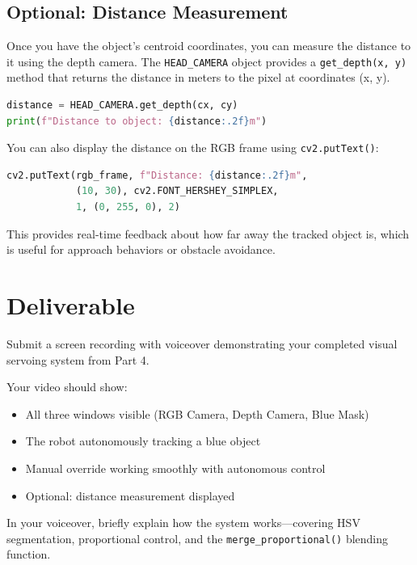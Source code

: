 \documentclass[11pt,a4paper]{article}
\begin{document}
\subsection*{Optional: Distance Measurement}

Once you have the object's centroid coordinates, you can measure the distance to it using the depth camera. The \texttt{HEAD\_CAMERA} object provides a \texttt{get\_depth(x, y)} method that returns the distance in meters to the pixel at coordinates (x, y).

\begin{lstlisting}[language=Python]
distance = HEAD_CAMERA.get_depth(cx, cy)
print(f"Distance to object: {distance:.2f}m")
\end{lstlisting}

You can also display the distance on the RGB frame using \texttt{cv2.putText()}:

\begin{lstlisting}[language=Python]
cv2.putText(rgb_frame, f"Distance: {distance:.2f}m", 
            (10, 30), cv2.FONT_HERSHEY_SIMPLEX, 
            1, (0, 255, 0), 2)
\end{lstlisting}

This provides real-time feedback about how far away the tracked object is, which is useful for approach behaviors or obstacle avoidance.

\newpage

\section*{Deliverable}

Submit a screen recording with voiceover demonstrating your completed visual servoing system from Part 4.

Your video should show:
\begin{itemize}
    \item All three windows visible (RGB Camera, Depth Camera, Blue Mask)
    \item The robot autonomously tracking a blue object
    \item Manual override working smoothly with autonomous control
    \item Optional: distance measurement displayed
\end{itemize}

In your voiceover, briefly explain how the system works—covering HSV segmentation, proportional control, and the \texttt{merge\_proportional()} blending function.
\end{document}
